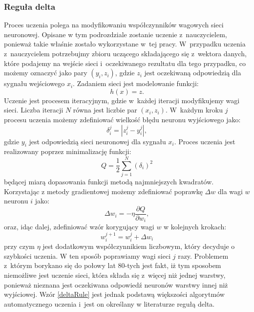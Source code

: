 \subsubsection{Reguła delta}
Proces uczenia polega na modyfikowaniu współczynników wagowych sieci neuronowej. Opisane w tym podrozdziale zostanie uczenie z~nauczycielem, ponieważ takie właśnie zostało wykorzystane w~tej pracy. W~przypadku uczenia z~nauczycielem potrzebujmy zbioru uczącego składającego się z~wektora danych, które podajemy na wejście sieci i~oczekiwanego rezultatu dla tego przypadku, co możemy oznaczyć jako pary $(y_i,z_i)$, gdzie $z_i$ jest oczekiwaną odpowiedzią dla sygnału wejściowego $x_i$. Zadaniem sieci jest modelowanie funkcji:
\begin{equation}
h(x)=z.
\end{equation}
Uczenie jest procesem iteracyjnym, gdzie w~każdej iteracji modyfikujemy wagi sieci. Liczba iteracji $N$ równa jest liczbie par $(x_i,z_i)$. W~każdym kroku $j$ procesu uczenia możemy zdefiniować wielkość błędu neuronu wyjściowego jako:
\begin{equation}
\delta_i^j = |z_i^j - y_i^j|,
\end{equation}
gdzie $y_i$ jest odpowiedzią sieci neuronowej dla sygnału $x_i$.
Proces uczenia jest realizowany poprzez minimalizację funkcji:
\begin{equation}\label{minFunc}
Q=\frac{1}{2}\sum_{j=1}^{N}(\delta_i)^2
\end{equation}
będącej miarą dopasowania funkcji metodą najmniejszych kwadratów. Korzystając z metody gradientowej możemy zdefiniować poprawkę $\Delta w$ dla wagi $w$ neuronu $i$ jako:
\begin{equation}\label{deltaRule}
\Delta w_i = - \eta \frac{\partial Q}{\partial w_i},
\end{equation}
oraz, idąc dalej, zdefiniować wzór korygujący wagi $w$ w kolejnych krokach:
\begin{equation}
w^{j+1}_i = w^j_i + \Delta w_i
\end{equation}
przy czym $\eta$ jest dodatkowym współczynnikiem liczbowym, który decyduje o szybkości uczenia. W ten sposób poprawiamy wagi sieci $j$ razy. Problemem z~którym borykano się do połowy lat 80-tych jest fakt, iż tym sposobem niemożliwe jest uczenie sieci, która składa się z~więcej niż jednej warstwy, ponieważ nieznana jest oczekiwana odpowiedź neuronów warstwy innej niż wyjściowej. Wzór \ref{deltaRule} jest jednak podstawą większości algorytmów automatycznego uczenia\cite{tadeusiewicz} i~jest on określany w literaturze regułą delta\cite{briefIntroduction}.

